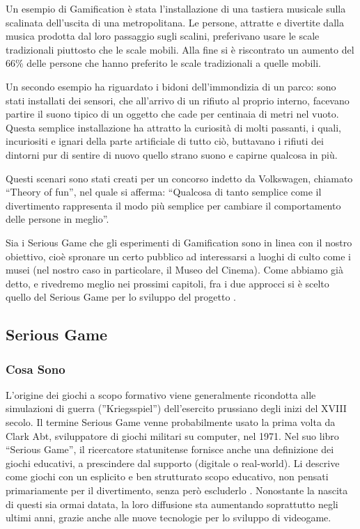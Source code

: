 Un esempio di Gamification è stata l'installazione di una tastiera musicale sulla scalinata dell'uscita di una metropolitana. Le persone, attratte e divertite dalla musica prodotta dal loro passaggio sugli scalini, preferivano usare le scale tradizionali piuttosto che le scale mobili. Alla fine si è riscontrato un aumento del 66\% delle persone che hanno preferito le scale tradizionali a quelle mobili.

Un secondo esempio ha riguardato i bidoni dell'immondizia di un parco: sono stati installati dei sensori, che all'arrivo di un rifiuto al proprio interno, facevano partire il suono tipico di un oggetto che cade per centinaia di metri nel vuoto. Questa semplice installazione ha attratto la curiosità di molti passanti, i quali, incuriositi e ignari della parte artificiale di tutto ciò, buttavano i rifiuti dei dintorni pur di sentire di nuovo quello strano suono e capirne qualcosa in più.

Questi scenari sono stati creati per un concorso indetto da Volkswagen, chiamato ``Theory of fun'', nel quale si afferma: ``Qualcosa di tanto semplice come il divertimento rappresenta il modo più semplice per cambiare il comportamento delle persone in meglio''.

Sia i Serious Game che gli esperimenti di Gamification sono in linea con il nostro obiettivo, cioè spronare un certo pubblico ad interessarsi a luoghi di culto come i musei (nel nostro caso in particolare, il Museo del Cinema). Come abbiamo già detto, e rivedremo meglio nei prossimi capitoli, fra i due approcci si è scelto quello del Serious Game per lo sviluppo del progetto .

\newpage

\subsection{Serious Game}

\subsubsection{Cosa Sono}
\label{sec:cosasono}

L'origine dei giochi a scopo formativo viene generalmente ricondotta alle simulazioni di guerra (''Kriegsspiel'') dell'esercito prussiano degli inizi del XVIII secolo.
Il termine Serious Game venne probabilmente usato la prima volta da Clark Abt, sviluppatore di giochi militari su computer, nel 1971. Nel suo libro ``Serious Game'', il ricercatore statunitense fornisce anche una definizione dei giochi educativi, a prescindere dal supporto (digitale o real-world). Li descrive come giochi con un esplicito e ben strutturato scopo educativo, non pensati primariamente per il divertimento, senza però escluderlo \cite{wikiseriousgames}.
Nonostante la nascita di questi sia ormai datata, la loro diffusione sta aumentando soprattutto negli ultimi anni, grazie anche alle nuove tecnologie per lo sviluppo di videogame.

